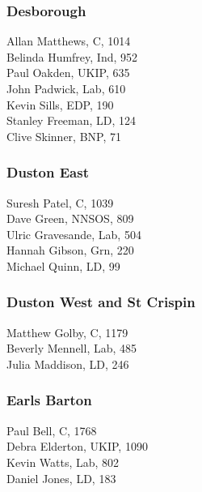 \documentclass[a4paper,openany,10pt]{book}
\begin{document}
\subsubsection*{Desborough}



Allan Matthews, C, 1014\\
Belinda Humfrey, Ind, 952\\
Paul Oakden, UKIP, 635\\
John Padwick, Lab, 610\\
Kevin Sills, EDP, 190\\
Stanley Freeman, LD, 124\\
Clive Skinner, BNP, 71\\


\subsubsection*{Duston East}



Suresh Patel, C, 1039\\
Dave Green, NNSOS, 809\\
Ulric Gravesande, Lab, 504\\
Hannah Gibson, Grn, 220\\
Michael Quinn, LD, 99\\


\subsubsection*{Duston West and St Crispin}



Matthew Golby, C, 1179\\
Beverly Mennell, Lab, 485\\
Julia Maddison, LD, 246\\


\subsubsection*{Earls Barton}



Paul Bell, C, 1768\\
Debra Elderton, UKIP, 1090\\
Kevin Watts, Lab, 802\\
Daniel Jones, LD, 183\\
\end{document}
